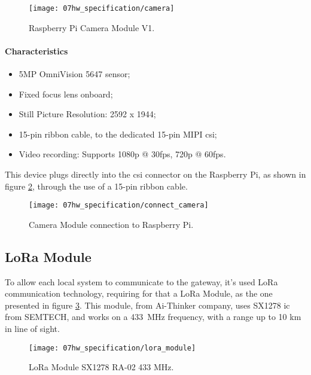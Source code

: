 \begin{figure}[H]
	\centering
	\texttt{[image: 07hw\_specification/camera]}
	\caption{Raspberry Pi Camera Module V1.}
	\label{fig:camera}
\end{figure}

\paragraph*{Characteristics}
\begin{itemize}
	\item 5MP OmniVision 5647 sensor;
	\item Fixed focus lens onboard;
	\item Still Picture Resolution: 2592 x 1944;
	\item 15-pin ribbon cable, to the dedicated 15-pin MIPI \ac{csi};
	\item Video recording: Supports 1080p @ 30fps, 720p @ 60fps.
\end{itemize}

\clearpage
{}
This device plugs directly into the \ac{csi} connector on the Raspberry Pi, as shown in figure \ref{fig:connect_camera}, through the use of a 15-pin ribbon cable.

\begin{figure}[ht]
	\centering
	\texttt{[image: 07hw\_specification/connect\_camera]}
	\caption{Camera Module connection to Raspberry Pi.}
	\label{fig:connect_camera}
\end{figure}
\clearpage
\subsection{LoRa Module}
To allow each local system to communicate to the gateway, it's used LoRa communication technology, requiring for that a LoRa Module, as the one presented in figure \ref{fig:lora_module}. This module, from Ai-Thinker company, uses SX1278 \ac{ic} from SEMTECH, and works on a 433~MHz frequency, with a range up to 10 km in line of sight. \cite{sx1278} \cite{lora_module}

\begin{figure}[H]
	\centering
	\texttt{[image: 07hw\_specification/lora\_module]}
	\caption{LoRa Module SX1278 RA-02 433 MHz.}
	\label{fig:lora_module}
\end{figure}

